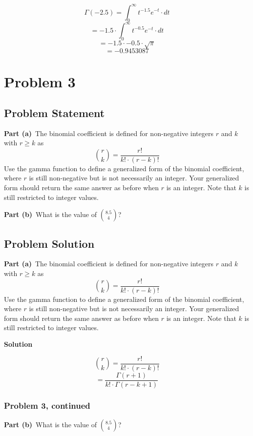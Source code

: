 \documentclass[12pt]{article}
\theoremstyle{definition}
\begin{document}
$$ \Gamma(-2.5) = \int_0^\infty t^{-1.5} e^{-t} \cdot dt$$
$$ = -1.5 \cdot \int_0^\infty t^{-0.5} e^{-t} \cdot dt $$
$$ = -1.5 \cdot -0.5 \cdot \sqrt{\pi}$$
$$ = -0.9453087 $$

\newpage
\section*{Problem 3}

\subsection*{Problem Statement}

{\bf Part (a)}\ The binomial coefficient is defined for non-negative integers $r$ and $k$ with $r \geq k$ as
$$
{r \choose k} = \frac{r!}{k! \cdot (r - k)!}
$$
Use the gamma function to define a generalized form of the binomial coefficient, where $r$ is still non-negative but is not necessarily an integer. Your generalized form should return the same answer as before when $r$ is an integer. Note that $k$ is still restricted to integer values.

\bigskip
\noindent
{\bf Part (b)}\ What is the value of
$
\displaystyle { 8.5 \choose 4}
$?


\subsection*{Problem Solution}


{\bf Part (a)}\ The binomial coefficient is defined for non-negative integers $r$ and $k$ with $r \geq k$ as
$$
{r \choose k} = \frac{r!}{k! \cdot (r - k)!}
$$
Use the gamma function to define a generalized form of the binomial coefficient, where $r$ is still non-negative but is not necessarily an integer. Your generalized form should return the same answer as before when $r$ is an integer. Note that $k$ is still restricted to integer values.

\bigskip
\noindent
{\bf Solution}

$$ {r \choose k} = \frac{r!}{k! \cdot (r - k)!} $$
$$ = \frac{\Gamma (r+1)}{k! \cdot \Gamma (r - k + 1)} $$

\newpage
\subsubsection*{Problem 3, continued}

\vspace{0.5in}
\noindent
{\bf Part (b)}\ What is the value of
$
\displaystyle { 8.5 \choose 4}
$?
\end{document}
